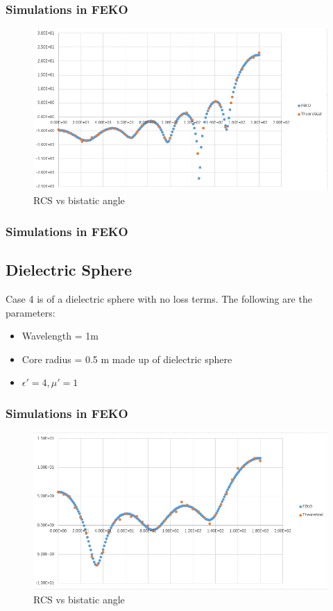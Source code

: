 \documentclass{beamer}
\begin{document}
\begin{frame}
\frametitle{Simulations in FEKO}
\begin{figure}[H]
\centering
\includegraphics[width = \textwidth]{coating3.PNG}
\caption{RCS vs bistatic angle}
\end{figure}
\end{frame}

\begin{frame}
\frametitle{Simulations in FEKO}
\subsection{Dielectric Sphere}
Case 4 is of a dielectric sphere with no loss terms. The following are the parameters:
\begin{itemize}
\item Wavelength = 1m
\item Core radius = 0.5 m made up of dielectric sphere
\item $\epsilon' = 4, \mu' = 1$
\end{itemize}
\end{frame}
\begin{frame}
\frametitle{Simulations in FEKO}
\begin{figure}[H]
\centering
\includegraphics[width = \textwidth]{case4.PNG}
\caption{RCS vs bistatic angle}
\end{figure}
\end{frame}
\end{document}
